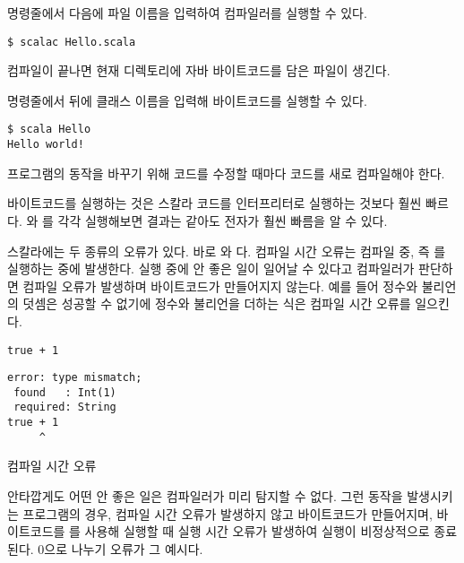 명령줄에서  다음에 파일 이름을 입력하여 컴파일러를 실행할 수 있다.

\begin{verbatim}
$ scalac Hello.scala
\end{verbatim}

컴파일이 끝나면 현재 디렉토리에 자바 바이트코드를 담은  파일이
생긴다.

명령줄에서  뒤에 클래스 이름을 입력해 바이트코드를 실행할 수 있다.

\begin{verbatim}
$ scala Hello
Hello world!
\end{verbatim}

프로그램의 동작을 바꾸기 위해 코드를 수정할 때마다 코드를 새로 컴파일해야 한다.

바이트코드를 실행하는 것은 스칼라 코드를 인터프리터로 실행하는 것보다 훨씬
빠르다. 와 를 각각 실행해보면 결과는 같아도 전자가
훨씬 빠름을 알 수 있다.

스칼라에는 두 종류의 오류가 있다. 바로 와
다. 컴파일 시간 오류는 컴파일 중, 즉 를
실행하는 중에 발생한다. 실행 중에 안 좋은 일이 일어날 수 있다고 컴파일러가
판단하면 컴파일 오류가 발생하며 바이트코드가 만들어지지 않는다. 예를 들어 정수와
불리언의 덧셈은 성공할 수 없기에 정수와 불리언을 더하는 식은 컴파일 시간 오류를
일으킨다.

\begin{verbatim}
true + 1
\end{verbatim}
\vspace{-1em}
\begin{mdframed}[hidealllines=true,backgroundcolor=gray!10,innerleftmargin=3pt,innerrightmargin=3pt,leftmargin=-3pt,rightmargin=-3pt]
\begin{verbatim}
error: type mismatch;
 found   : Int(1)
 required: String
true + 1
     ^
\end{verbatim}
\vspace{-2em}
\begin{flushright}
\scriptsize\textsf{컴파일 시간 오류}
\end{flushright}
\end{mdframed}

안타깝게도 어떤 안 좋은 일은 컴파일러가 미리 탐지할 수 없다. 그런 동작을
발생시키는 프로그램의 경우, 컴파일 시간 오류가 발생하지 않고 바이트코드가
만들어지며, 바이트코드를 를 사용해 실행할 때 실행 시간 오류가 발생하여
실행이 비정상적으로 종료된다. 0으로 나누기 오류가 그 예시다.

